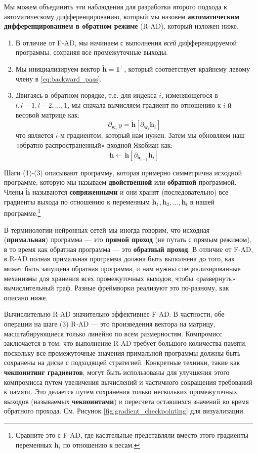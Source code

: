 Мы можем объединить эти наблюдения для разработки второго подхода к автоматическому дифференцированию, который мы назовем \textbf{автоматическим дифференцированием в обратном режиме} (R-AD), который изложен ниже.

\begin{enumerate}
\item В отличие от F-AD, мы начинаем с выполнения \textit{всей} дифференцируемой программы, сохраняя все промежуточные выходы.
\item Мы инициализируем вектор $\widetilde{\mathbf{h}} =\mathbf{1}^\top$, который соответствует крайнему левому члену в \eqref{eq:backward_pass}.
\item Двигаясь в обратном порядке, т.е. для индекса $i$, изменяющегося в $l, l-1, l-2,\ldots, 1$, мы сначала вычисляем градиент по отношению к $i$-й весовой матрице как:
%
$$\partial_{\mathbf{w}_i}\, y  = \widetilde{\mathbf{h}} \left[\partial_{\mathbf{w}_i} \mathbf{h}_{i}\right]$$
%
что является $i$-м градиентом, который нам нужен. Затем мы обновляем наш «обратно распространенный» входной Якобиан как:
%
$$\widetilde{\mathbf{h}} \leftarrow \widetilde{\mathbf{h}} \left[\partial_{\mathbf{h}_{i-1}}\mathbf{h}_{i}\right]$$
\end{enumerate}

Шаги (1)-(3) описывают программу, которая примерно симметрична исходной программе, которую мы называем \textbf{двойственной} или \textbf{обратной} программой. Члены $\widetilde{\mathbf{h}}$ называются \textbf{сопряженными} и они хранят (последовательно) все градиенты выхода по отношению к переменным $\mathbf{h}_1, \mathbf{h}_2, \ldots, \mathbf{h}_{l}$ в нашей программе.\footnote{Сравните это с F-AD, где касательные представляли вместо этого градиенты переменных $\mathbf{h}_i$ по отношению к весам.}

В терминологии нейронных сетей мы иногда говорим, что исходная (\textbf{примальная}) программа — это \textbf{прямой проход} (не путать с прямым режимом), в то время как обратная программа — это \textbf{обратный проход}. В отличие от F-AD, в R-AD полная примальная программа должна быть выполнена до того, как может быть запущена обратная программа, и нам нужны специализированные механизмы для хранения всех промежуточных выходов, чтобы «развернуть» вычислительный граф. Разные фреймворки реализуют это по-разному, как описано ниже.

Вычислительно R-AD значительно эффективнее F-AD. В частности, обе операции на шаге (3) R-AD — это произведения вектора на матрицу, масштабирующиеся только линейно по всем размерностям. Компромисс заключается в том, что выполнение R-AD требует большого количества памяти, поскольку все промежуточные значения примальной программы должны быть сохранены на диске с подходящей стратегией. Конкретные техники, такие как \textbf{чекпоинтинг градиентов}, могут быть использованы для улучшения этого компромисса путем увеличения вычислений и частичного сокращения требований к памяти. Это делается путем сохранения только нескольких промежуточных выходов (называемых \textbf{чекпоинтами}) и пересчета оставшихся значений во время обратного прохода. См. Рисунок \ref{fig:gradient_checkpointing} для визуализации.


